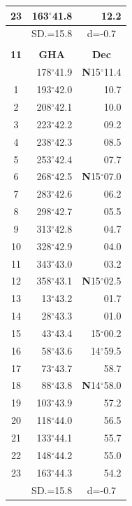 \documentclass[10pt, a4paper]{report}
\begin{document}
\begin{scriptsize}
\begin{tabular*}{0.2\textwidth}[t]{@{\extracolsep{\fill}}|c|rr|}
23 & 163$^\circ$41.8 & 12.2\\
\hline
\rule{0pt}{2.4ex} & \multicolumn{1}{c}{SD.=15.8} & \multicolumn{1}{c|}{d=-0.7}\\
\hline
\multicolumn{1}{c}{}\\[-0.5ex]\hline
\multicolumn{1}{|c|}{\rule{0pt}{2.6ex}\textbf{11}} & \multicolumn{1}{c}{\textbf{GHA}} & \multicolumn{1}{c|}{\textbf{Dec}}\\
\hline\rule{0pt}{2.6ex}\noindent
0 & 178$^\circ$41.9 & \textbf{N}15$^\circ$11.4\\
1 & 193$^\circ$42.0 & 10.7\\
2 & 208$^\circ$42.1 & 10.0\\
3 & 223$^\circ$42.2 & \raisebox{0.24ex}{\boldmath$\cdot$~\boldmath$\cdot$~~}09.2\\
4 & 238$^\circ$42.3 & 08.5\\
5 & 253$^\circ$42.4 & 07.7\\[2Pt]
6 & 268$^\circ$42.5 & \textbf{N}15$^\circ$07.0\\
7 & 283$^\circ$42.6 & 06.2\\
8 & 298$^\circ$42.7 & 05.5\\
9 & 313$^\circ$42.8 & \raisebox{0.24ex}{\boldmath$\cdot$~\boldmath$\cdot$~~}04.7\\
10 & 328$^\circ$42.9 & 04.0\\
11 & 343$^\circ$43.0 & 03.2\\[2Pt]
12 & 358$^\circ$43.1 & \textbf{N}15$^\circ$02.5\\
13 & 13$^\circ$43.2 & 01.7\\
14 & 28$^\circ$43.3 & 01.0\\
15 & 43$^\circ$43.4 & 15$^\circ$00.2\\
16 & 58$^\circ$43.6 & 14$^\circ$59.5\\
17 & 73$^\circ$43.7 & 58.7\\[2Pt]
18 & 88$^\circ$43.8 & \textbf{N}14$^\circ$58.0\\
19 & 103$^\circ$43.9 & 57.2\\
20 & 118$^\circ$44.0 & 56.5\\
21 & 133$^\circ$44.1 & \raisebox{0.24ex}{\boldmath$\cdot$~\boldmath$\cdot$~~}55.7\\
22 & 148$^\circ$44.2 & 55.0\\
23 & 163$^\circ$44.3 & 54.2\\
\hline
\rule{0pt}{2.4ex} & \multicolumn{1}{c}{SD.=15.8} & \multicolumn{1}{c|}{d=-0.7}\\
\hline
\end{tabular*}\noindent

\end{scriptsize}
\end{document}
